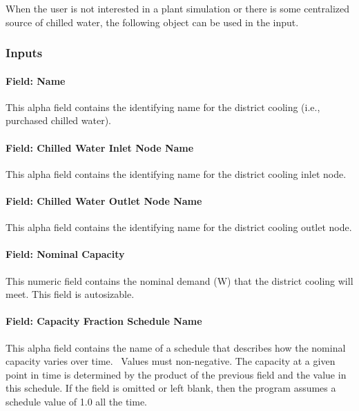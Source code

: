 When the user is not interested in a plant simulation or there is some centralized source of chilled water, the following object can be used in the input.

\subsubsection{Inputs}\label{inputs-16-008}

\paragraph{Field: Name}\label{field-name-15-006}

This alpha field contains the identifying name for the district cooling (i.e., purchased chilled water).

\paragraph{Field: Chilled Water Inlet Node Name}\label{field-chilled-water-inlet-node-name-9}

This alpha field contains the identifying name for the district cooling inlet node.

\paragraph{Field: Chilled Water Outlet Node Name}\label{field-chilled-water-outlet-node-name-10}

This alpha field contains the identifying name for the district cooling outlet node.

\paragraph{Field: Nominal Capacity}\label{field-nominal-capacity-10}

This numeric field contains the nominal demand (W) that the district cooling will meet. This field is autosizable.

\paragraph{Field: Capacity Fraction Schedule Name}\label{field-capacity-fraction-schedule-name}

This alpha field contains the name of a schedule that describes how the nominal capacity varies over time.~ Values must non-negative. The capacity at a given point in time is determined by the product of the previous field and the value in this schedule. If the field is omitted or left blank, then the program assumes a schedule value of 1.0 all the time.


